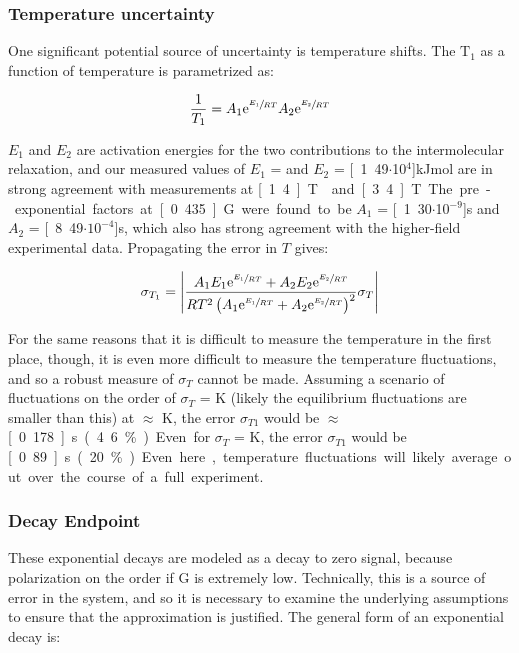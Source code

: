 \documentclass[PaulGanssle-Thesis.tex]{subfiles}
\begin{document}
\subsubsection{Temperature uncertainty}
\label{relaxometry.t1.uncertainty.temp}
One significant potential source of uncertainty is temperature shifts. The $\mathrm{T}_{1}$ as a function of temperature is parametrized as:\cite{Hindman1973,bentum-2011,Simpson1958}

\begin{equation}
\frac{1}{T_{1}} = A_{1}\mathrm{e}^{\sfrac{E_{1}}{RT}}A_{2}\mathrm{e}^{\sfrac{E_{2}}{RT}}
\end{equation}

$E_1$ and $E_2$ are activation energies for the two contributions to the intermolecular relaxation, and our measured values of $E_{1}$ =  and $E_{2}$ = \unit[1.49$\cdot $10$^{4}$]{kJ}{mol} are in strong agreement with measurements at \unit[1.4]{T}\cite{Hindman1973} and \unit[3.4]{T}. The pre-exponential factors at \unit[0.435]{G} were found to be $A_{1}$ = \unit[1.30$\cdot $10$^{-9}$]{s} and $A_{2}$ = \unit[8.49$\cdot \mathrm{10}^{-4}$]{s}, which also has strong agreement with the higher-field experimental data. Propagating the error in $T$ gives:

\begin{equation}
\label{eqn:TError}
\sigma_{T_{1}} = \left|\frac{A_{1}E_{1}\mathrm{e}^{\sfrac{E_{1}}{RT}} + A_{2}E_{2}\mathrm{e}^{\sfrac{E_{2}}{RT}}}{RT^2\left(A_{1}\mathrm{e}^{\sfrac{E_{1}}{RT}} + A_{2}\mathrm{e}^{\sfrac{E_{2}}{RT}}\right)^2}\sigma_{T}\right|
\end{equation}

For the same reasons that it is difficult to measure the temperature in the first place, though, it is even more difficult to measure the temperature fluctuations, and so a robust measure of $\sigma_T$ cannot be made. Assuming a scenario of fluctuations on the order of $\sigma_{T}$ = \unit[2]{K} (likely the equilibrium fluctuations are smaller than this) at $\approx$ \unit[38]{K}, the error $\sigma_{T1}$ would be $\approx$ \unit[0.178]{s} (4.6\%). Even for $\sigma_{T}$ = \unit[10]{K}, the error $\sigma_{T1}$ would be \unit[0.89]{s} (20\%). Even here, temperature fluctuations will likely average out over the course of a full experiment.

\subsubsection{Decay Endpoint}
\label{relaxometry.t1.uncertainty.decayendpoint}
These exponential decays are modeled as a decay to zero signal, because polarization on the order if \unit[1]{G} is extremely low. Technically, this is a source of error in the system, and so it is necessary to examine the underlying assumptions to ensure that the approximation is justified. The general form of an exponential decay is:
\end{document}

